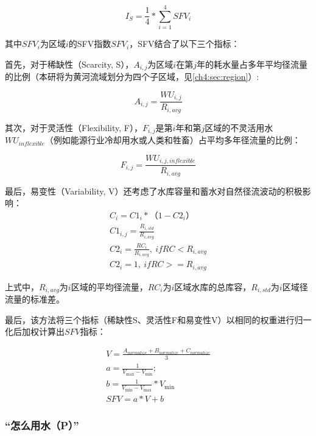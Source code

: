 \begin{equation}
    I_S = \frac{1}{4} * \sum_{i=1}^4 SFV_{i}
\end{equation}

其中$SFV_i$为区域$i$的SFV指数$SFV_i$，SFV结合了以下三个指标：

首先，对于稀缺性（Scarcity, S），$A_{i, j}$为区域$i$在第$j$年的耗水量占多年平均径流量的比例（本研将为黄河流域划分为四个子区域，见\ref{ch4:sec:region}）:

\begin{equation}
    A_{i, j} = \frac{WU_{i,j}}{R_{i, avg}}
\end{equation}

其次，对于灵活性（Flexibility, F），$F_{i, j}$是第$i$年和第$j$区域的不灵活用水$WU_{inflexible}$（例如能源行业冷却用水或人类和牲畜）占平均多年径流量的比例：

\begin{equation}
    F_{i, j} = \frac{WU_{i, j, inflexible}}{R_{i, avg}}
\end{equation}

最后，易变性（Variability, V）还考虑了水库容量和蓄水对自然径流波动的积极影响：
\begin{gather}
    C_i = C1_i * （1 - C2_i） \\
    C1_{i, j} = \frac{R_{i, std}}{R_{i, avg}} \\
    C2_{i} = \frac{RC_{i}}{R_{i, avg}}, \ if RC < R_{i, avg} \\
    C2_{i} = 1, \ if RC >= R_{i, avg}
\end{gather}

上式中，$R_{i, avg}$为$i$区域的平均径流量，$RC_i$为$i$区域水库的总库容，$R_{i, std}$为$i$区域径流量的标准差。

最后，该方法将三个指标（稀缺性S、灵活性F和易变性V）以相同的权重进行归一化后加权计算出$SFV$指标：

\begin{gather}
    V = \frac{A_{normalize} + B_{normalize} + C_{normalize}}{3}\\
    a = \frac{1}{V_{\max} - V_{\min}};\\
    b = \frac{1}{V_{\min} - V_{\max}} * V_{\min}\\
    SFV = a * V + b
\end{gather}


\subsubsection*{“怎么用水（P）”}

